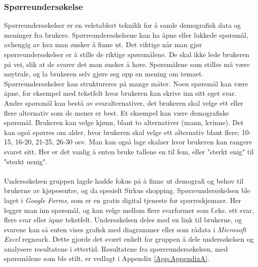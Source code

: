 \subsubsection{Spørreundersøkelse}
Spørreundersøkelser er en veletablert teknikk for å samle demografisk data og meninger fra brukere\cite[s.~244]{preece}. Spørreundersøkelsene kan ha åpne eller lukkede spørsmål, avhengig av hva man ønsker å finne ut. Det viktige når man gjør spørreundersøkelser er å stille de riktige spørsmålene. De skal ikke lede brukeren på vei, slik at de svarer det man ønsker å høre. Spørsmålene som stilles må være nøytrale, og la brukeren selv gjøre seg opp en mening om temaet.
Spørreundersøkelser kan struktureres på mange måter. Noen spørsmål kan være åpne, for eksempel med tekstfelt hvor brukeren kan skrive inn sitt eget svar. Andre spørsmål kan bestå av svaralternativer, det brukeren skal velge ett eller flere alternativ som de mener er best. Et eksempel kan være demografiske spørsmål\cite[s.~245]{preece}. Brukeren kan velge kjønn, blant to alternativer (mann, kvinne). Det kan også spørres om alder, hvor brukeren skal velge ett alternativ blant flere; 10-15, 16-20, 21-25, 26-30 osv. Man kan også lage skalaer hvor brukeren kan rangere svaret sitt. Her er det vanlig å enten bruke tallene en til fem, eller "sterkt enig" til "sterkt uenig".
\\\\
Undersøkelsen gruppen lagde hadde fokus på å finne ut demografi og behov til brukerne av kjøpesentre, og da spesielt Sirkus shopping. Spørreundersøkelsen ble laget i \textit{Google Forms}, som er en gratis digital tjeneste for spørreskjemaer. Her legger man inn spørsmål, og kan velge mellom flere svarformer som f.eks. ett svar, flere svar eller åpne tekstfelt. Undersøkelsen deles med en link til brukerne, og svarene kan så enten vises grafisk med diagrammer eller som rådata i \textit{Microsoft Excel} regneark. Dette gjorde det svært enkelt for gruppen å dele undersøkelsen og analysere resultatene i ettertid. Resultatene fra spørreundersøkelsen, med spørsmålene som ble stilt, er vedlagt i Appendix \ref{App:AppendixA}.
\\\\
